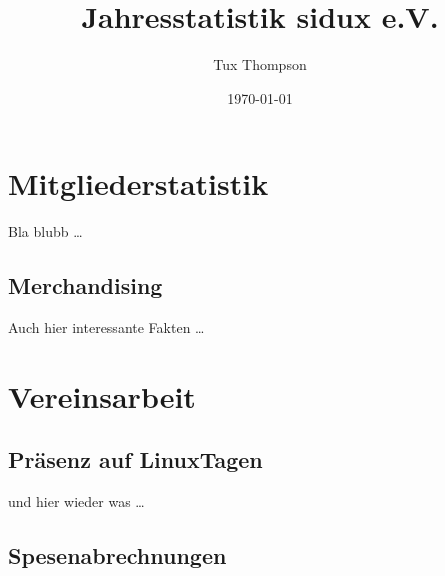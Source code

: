 \documentclass{scrartcl}
\title{Jahresstatistik sidux e.V.}
\author{Tux Thompson}
\date{\today}
\begin{document}
\maketitle
\tableofcontents

\section{Mitgliederstatistik}
Bla blubb \ldots
\subsection{Merchandising}
Auch hier interessante Fakten \ldots

\section{Vereinsarbeit}
\subsection{Präsenz auf LinuxTagen}
und hier wieder was \ldots
\subsection{Spesenabrechnungen}
\end{document}

